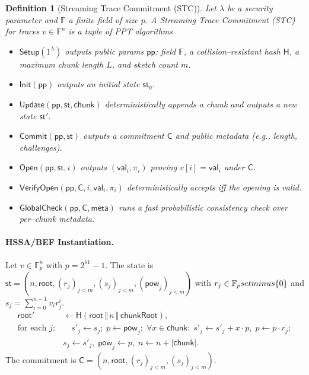 
\newtheorem{definition}{Definition}
\newtheorem{theorem}{Theorem}

\begin{definition}[Streaming Trace Commitment (STC)]
Let $\lambda$ be a security parameter and $\mathbb{F}$ a finite field of size $p$. A Streaming Trace Commitment (STC) for traces $v\in\mathbb{F}^n$ is a tuple of PPT algorithms
\\[(\mathsf{Setup},\mathsf{Init},\mathsf{Update},\mathsf{Commit},\mathsf{Open},\mathsf{VerifyOpen},\mathsf{GlobalCheck}).\\]
\vspace{-0.5ex}
\begin{itemize}
  \item $\mathsf{Setup}(1^\lambda)$ outputs public params $\mathsf{pp}$: field $\mathbb{F}$, a collision–resistant hash $\mathsf{H}$, a maximum chunk length $L$, and sketch count $m$.
  \item $\mathsf{Init}(\mathsf{pp})$ outputs an initial state $\mathsf{st}_0$.
  \item $\mathsf{Update}(\mathsf{pp},\mathsf{st},\mathsf{chunk})$ deterministically appends a chunk and outputs a new state $\mathsf{st}'$.
  \item $\mathsf{Commit}(\mathsf{pp},\mathsf{st})$ outputs a commitment $\mathsf{C}$ and public metadata (e.g., length, challenges).
  \item $\mathsf{Open}(\mathsf{pp},\mathsf{st},i)$ outputs $(\mathsf{val}_i,\pi_i)$ proving $v[i]=\mathsf{val}_i$ under $\mathsf{C}$.
  \item $\mathsf{VerifyOpen}(\mathsf{pp},\mathsf{C},i,\mathsf{val}_i,\pi_i)$ deterministically accepts iff the opening is valid.
  \item $\mathsf{GlobalCheck}(\mathsf{pp},\mathsf{C},\mathsf{meta})$ runs a fast probabilistic consistency check over per–chunk metadata.
\end{itemize}
\end{definition}

\paragraph{HSSA/BEF Instantiation.}
Let $v\in\mathbb{F}_p^n$ with $p=2^{61}{-}1$. The state is
$\mathsf{st}=(n,\mathsf{root},(r_j)_{j< m},(s_j)_{j< m},(\mathsf{pow}_j)_{j<m})$ with $r_j\in\mathbb{F}_p\\setminus\{0\}$ and $s_j=\sum_{i=0}^{n-1} v_i r_j^i$.
\begin{align*}
\mathsf{root}' &\leftarrow \mathsf{H}(\mathsf{root}\,\Vert\,n\,\Vert\,\mathsf{chunkRoot}), \\
\text{for each } j:&\quad s'_j\leftarrow s_j;\; p\leftarrow \mathsf{pow}_j;\; \forall x\in\mathsf{chunk}:\; s'_j\leftarrow s'_j + x\cdot p,\; p\leftarrow p\cdot r_j; \\
& s_j\leftarrow s'_j,\; \mathsf{pow}_j\leftarrow p,\; n\leftarrow n+|\mathsf{chunk}|.
\end{align*}
The commitment is $\mathsf{C}=(n,\mathsf{root},(r_j)_{j<m},(s_j)_{j<m})$.

